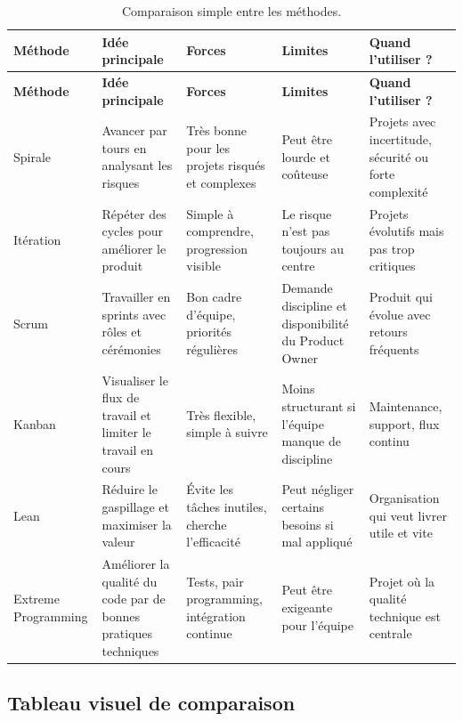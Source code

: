 \documentclass[12pt,a4paper]{article}
\begin{document}
\begin{longtable}{p{} p{} p{} p{} p{}}
\caption{Comparaison simple entre les méthodes.}\\
\toprule
\textbf{Méthode} & \textbf{Idée principale} & \textbf{Forces} & \textbf{Limites} & \textbf{Quand l'utiliser ?} \\
\midrule
\endfirsthead
\toprule
\textbf{Méthode} & \textbf{Idée principale} & \textbf{Forces} & \textbf{Limites} & \textbf{Quand l'utiliser ?} \\
\midrule
\endhead
Spirale & Avancer par tours en analysant les risques & Très bonne pour les projets risqués et complexes & Peut être lourde et coûteuse & Projets avec incertitude, sécurité ou forte complexité \\
\midrule
Itération & Répéter des cycles pour améliorer le produit & Simple à comprendre, progression visible & Le risque n'est pas toujours au centre & Projets évolutifs mais pas trop critiques \\
\midrule
Scrum & Travailler en sprints avec rôles et cérémonies & Bon cadre d'équipe, priorités régulières & Demande discipline et disponibilité du Product Owner & Produit qui évolue avec retours fréquents \\
\midrule
Kanban & Visualiser le flux de travail et limiter le travail en cours & Très flexible, simple à suivre & Moins structurant si l'équipe manque de discipline & Maintenance, support, flux continu \\
\midrule
Lean & Réduire le gaspillage et maximiser la valeur & Évite les tâches inutiles, cherche l'efficacité & Peut négliger certains besoins si mal appliqué & Organisation qui veut livrer utile et vite \\
\midrule
Extreme Programming & Améliorer la qualité du code par de bonnes pratiques techniques & Tests, pair programming, intégration continue & Peut être exigeante pour l'équipe & Projet où la qualité technique est centrale \\
\bottomrule
\end{longtable}

\subsection{Tableau visuel de comparaison}
\end{document}
